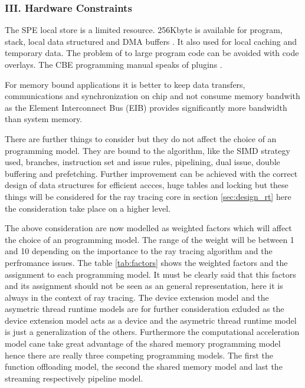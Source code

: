 \documentclass[DIV10, abstracton, openright, footsepline, headsepline, twoside, 9pt,
bigheadings]{scrreprt}
\begin{document}
\subsubsection*{III. Hardware  Constraints}
\label{sec:hardconst}

The SPE local store is a limited resource. 256Kbyte is available for program,
stack, local data structured and DMA buffers \cite{Brokenshire06}. It also used
for local caching and temporary data. The problem of to large program code can be
avoided with code overlays. The CBE programming manual speaks of plugins
\cite{IBMhb06}.

For memory bound applications it is better to keep data transfers, communications
and synchronization on chip and not consume memory bandwith as the Element
Interconnect Bus (EIB) provides
significantly more bandwidth than system memory.

There are further things to consider but they do not affect the choice of an
programming model. They are bound to the algorithm, like the SIMD strategy used,
branches, instruction set and issue rules, pipelining, dual issue, double
buffering and prefetching. Further improvement can be achieved with the correct
design of data structures for efficient accces, huge tables and locking but these
things will be considered for the ray tracing core in section \ref{sec:design_rt}
here the consideration take place on a higher level.


The above consideration are now modelled as weighted factors which will affect the
choice of an programming model. The range of the weight will be between 1 and 10
depending on the importance to the ray tracing algorithm and the perfromance issues.
The table \ref{tab:factors} shows the weighted factors and the assignment to each
programming model. It must be clearly said that this factors and its assignment
should not be seen as an general representation, here it is always in the context
of ray tracing. The device extension model and the asymetric thread runtime models are
for further  consideration exluded as the device extension model acts as a device
and the asymetric thread runtime model is just a generalization of the others.
Furthermore the computational acceleration model cane take great advantage of the
 shared memory programming model hence there are really three competing programming
models. The first the function offloading model, the second the shared memory
model and last the streaming respectively pipeline model.
\end{document}
